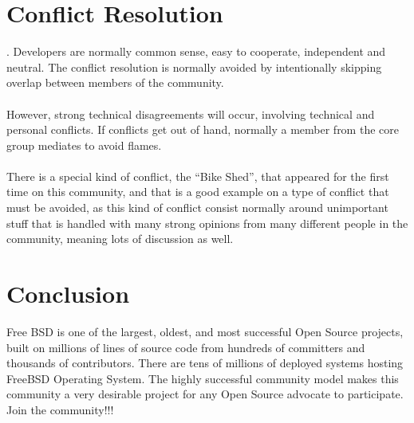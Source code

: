\documentclass[11pt]{article}
\begin{document}
\section{Conflict Resolution}.
Developers are normally common sense, easy to cooperate, independent and neutral. The conflict resolution is normally avoided by intentionally skipping overlap between members of the community.\\
\\
However, strong technical disagreements will occur, involving technical and personal conflicts. If conflicts get out of hand, normally a member from the core group mediates to avoid flames.\\
\\
There is a special kind of conflict, the ``Bike Shed'', that appeared for the first time on this community, and that is a good example on a type of conflict that must be avoided, as this kind of conflict consist normally around unimportant stuff that is handled with many strong opinions from many different people in the community, meaning lots of discussion as well.
\section{Conclusion}
Free BSD is one of the largest, oldest, and most successful Open Source projects, built on millions of lines of source code from hundreds of committers and thousands of contributors. There are tens of millions of deployed systems hosting FreeBSD Operating System. The highly successful community model makes this community a very desirable project for any Open Source advocate to participate. Join the community!!!
\end{document}
